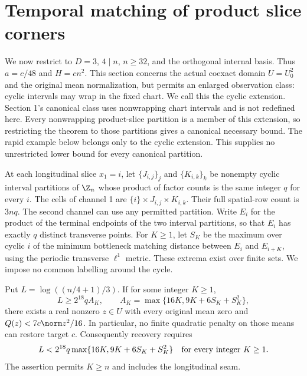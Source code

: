 \section{Temporal matching of product slice corners}\label{sec:temporal}
We now restrict to $D=3$, $4\mid n$, $n\geq32$, and the orthogonal
internal basis. Thus $a=c/48$ and $H=cn^2$. This section concerns the actual
coexact domain $U=U_0^2$ and the original mean normalization, but permits
an enlarged observation class: cyclic intervals may wrap in the fixed
chart. We call this the cyclic extension. Section 1's canonical class
uses nonwrapping chart intervals and is not redefined here. Every
nonwrapping product-slice partition is a member of this extension, so
restricting the theorem to those partitions gives a canonical necessary
bound. The rapid example below belongs only to the cyclic extension.
This supplies no unrestricted lower bound for every canonical partition.

At each longitudinal slice $x_1=i$, let $\{J_{i,j}\}_j$ and
$\{K_{i,k}\}_k$ be nonempty cyclic interval partitions of $\Z_n$ whose
product of factor counts is the same integer $q$ for every $i$. The cells
of channel 1 are $\{i\}\times J_{i,j}\times K_{i,k}$. Their full spatial-row
count is $3nq$. The second channel can use any permitted partition. Write
$E_i$ for the product of the terminal endpoints of the two interval
partitions, so that $E_i$ has exactly $q$ distinct transverse points.
For $K\geq1$, let $S_K$ be the maximum over cyclic $i$ of the minimum
bottleneck matching distance between $E_i$ and $E_{i+K}$, using the
periodic transverse $\ell^1$ metric. These extrema exist over finite sets.
We impose no common labelling around the cycle.

\begin{theorem}\label{thm:temporal}
Put $L=\log((n/4+1)/3)$. If for some integer $K\geq1$,
\begin{equation}\label{eq:windowthreshold}
 L\geq 2^{18}q A_K,\qquad
 A_K=\max\{16K,9K+6S_K+S_K^2\},
\end{equation}
there exists a real nonzero $z\in U$ with every original mean zero and
$Q(z)<7c\norm z^2/16$. In particular, no finite quadratic penalty on those
means can restore target $c$. Consequently recovery requires
\begin{equation}\label{eq:windownecessary}
 L<2^{18}q\max\{16K,9K+6S_K+S_K^2\}
 \quad\hbox{for every integer }K\geq1.
\end{equation}
The assertion permits $K\geq n$ and includes the longitudinal seam.
\end{theorem}

